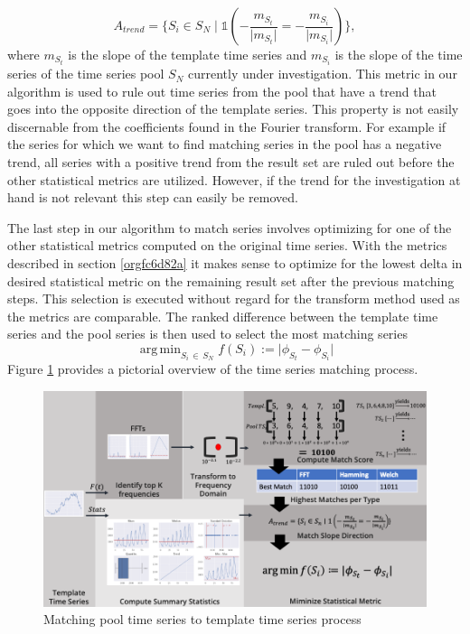 \documentclass[phd,black, hidelinks]{PrincetonThesis}
\DeclareMathOperator*{\argmin}{arg\,min}
\begin{document}
\begin{equation}
A_{trend} = \{S_{i} \in S_{N} \mid \mathds{1}\left(- \frac{m_{S_t}}{\lvert m_{S_t} \rvert}
=- \frac{m_{S_{i}}}{\lvert m_{S_{i}} \rvert} \right)  \},
\end{equation}
where \(m_{S_t}\) is the slope of the template time series and \(m_{S_i}\) is the slope of the time series of the time series pool \(S_N\) currently under investigation.  This metric in our algorithm is used to rule out time series from the pool that have a trend that goes into the opposite direction of the template series. This property is not easily discernable from the coefficients found in the Fourier transform. For example if the series for which we want to find matching series in the pool has a negative trend, all series with a positive trend from the result set are ruled out before the other statistical metrics are utilized. However, if the trend for the investigation at hand is not relevant this step can easily be removed.

The last step in our algorithm to match series involves optimizing for one of the other statistical metrics computed on the original time series. With the metrics described in section \ref{orgfc6d82a} it makes sense to optimize for the lowest delta in desired statistical metric on the remaining result set after the previous matching steps. This selection is executed without regard for the transform method used as the metrics are comparable. The ranked difference between the template time series and the pool series is then used to select the most matching series
\begin{equation}
\argmin_{S_i\, \in\, S_N} f(S_i):= \lvert\phi_{S_t} - \phi_{S_i}\rvert
\end{equation}
Figure \ref{fig:org13e9cb3} provides a pictorial overview of the time series matching process.
\begin{figure}[htbp]
\centering
\includegraphics[width=.9\linewidth]{./img/process_match_ts.png}
\caption{\label{fig:org13e9cb3}Matching pool time series to template time series process}
\end{figure}
\end{document}
